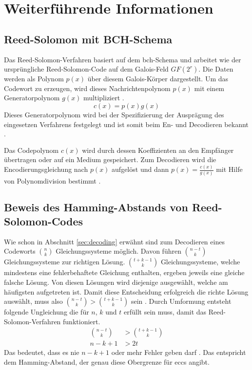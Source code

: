 \chapter{Weiterführende Informationen}\label{app:supplemental-information}

\section{Reed-Solomon mit BCH-Schema}\label{app:bch-rs}

Das Reed-Solomon-Verfahren basiert auf dem \acrfull{bch}-Schema und arbeitet wie der ursprüngliche Reed-Solomon-Code auf dem Galois-Feld $GF(2^r)$.
Die Daten werden als Polynom $p(x)$ über diesem Galois-Körper dargestellt. 
Um das Codewort zu erzeugen, wird dieses Nachrichtenpolynom $p(x)$ mit einem Generatorpolynom $g(x)$ multipliziert \cite{stoneMultipleBurstErrorCorrection1963}.
\[
c(x)=p(x)g(x)
\]
Dieses Generatorpolynom wird bei der Spezifizierung der Ausprägung des eingesetzen Verfahrens festgelegt und ist somit beim En- und Decodieren bekannt \cite{deepak2018WhatReedSolomon2022}.

Das Codepolynom $c(x)$ wird durch dessen Koeffizienten an den Empfänger übertragen oder auf ein Medium gespeichert.
Zum Decodieren wird die Encodierungsgleichung nach $p(x)$ aufgelöst und dann $p(x)=\frac{c(x)}{g(x)}$ mit Hilfe von Polynomdivision bestimmt \cite{geiselTutorialReedSolomonError1990}.

\section{Beweis des Hamming-Abstands von Reed-Solomon-Codes}\label{app:hammingDistanceRS}

Wie schon in Abschnitt \ref{sec:decoding} erwähnt sind zum Decodieren eines Codeworts $\binom{n}{k}$ Gleichungssysteme möglich.
Davon führen $\binom{n-t}{k}$ Gleichungssysteme zur richtigen Lösung.
$\binom{t+k-1}{k}$ Gleichungssysteme, welche mindestens eine fehlerbehaftete Gleichung enthalten, ergeben jeweils eine gleiche falsche Lösung.
Von diesen Lösungen wird diejenige ausgewählt, welche am häufigsten aufgetreten ist.
Damit diese Entscheidung erfolgreich die richte Lösung auswählt, muss also $\binom{n-t}{k} > \binom{t+k-1}{k}$ sein \cite{reedPolynomialCodesCertain1960}.
Durch Umformung entsteht folgende Ungleichung die für $n$, $k$ und $t$ erfüllt sein muss, damit das Reed-Solomon-Verfahren funktioniert.
\begin{align}
\binom{n-t}{k} &> \binom{t+k-1}{k} \nonumber\\
n-k+1 &> 2t \nonumber
\end{align}
Das bedeutet, dass es nie $n-k+1$ oder mehr Fehler geben darf \cite{reedPolynomialCodesCertain1960}.
Das entspricht dem Hamming-Abstand, der genau diese Obergrenze für \acrshort{ecc}s angibt.

